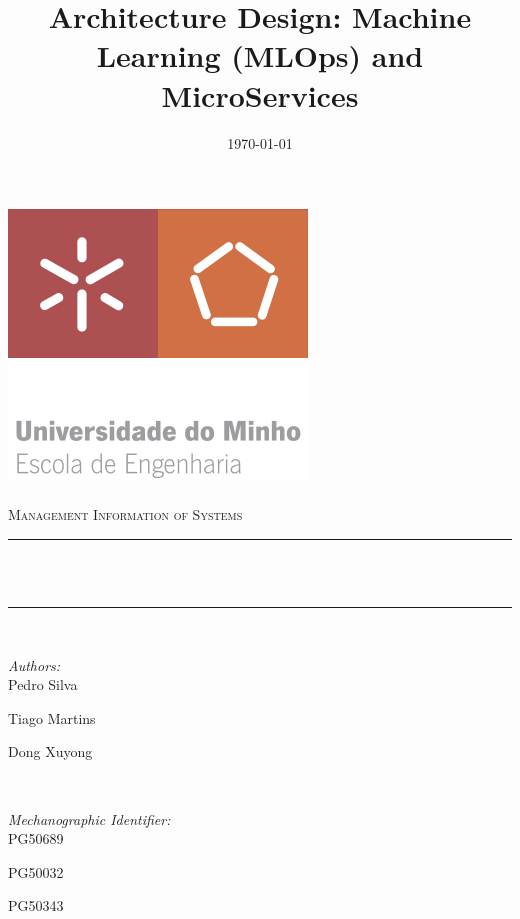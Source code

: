 \documentclass[12pt]{article}
\title{Architecture Design: Machine Learning (MLOps) and MicroServices}								%
\date{\today}											%
\makeatletter
\let\thetitle\@title
\let\thedate\@date
\makeatother
\begin{document}

\begin{titlepage}
	\centering
    \vspace*{0.5 cm}
    \includegraphics[scale = 0.75]{./assets/EEUMLOGO.png}\\[1.0 cm]	%
	\textsc{\Large}\\[0.5 cm]				%
	\textsc{\large Management Information of Systems}\\[0.5 cm]				%
	\rule{\linewidth}{0.2 mm} \\[0.4 cm]
	{ \huge \bfseries \thetitle}\\
	\rule{\linewidth}{0.2 mm} \\[1.5 cm]
	
	\begin{minipage}{0.4\textwidth}
		\begin{flushleft} \large
			\emph{Authors:}\\
			Pedro Silva
   
            Tiago Martins
            
            Dong Xuyong 
			\end{flushleft}
			\end{minipage}~
			\begin{minipage}{0.4\textwidth}
			\begin{flushright} \large
			\emph{Mechanographic Identifier:} \\
			PG50689
   
            PG50032
            
            PG50343%
		\end{flushright}
	\end{minipage}\\[2 cm]
	
	{\large \thedate}\\[2 cm]
 
	\vfill
	
\end{titlepage}
\end{document}
